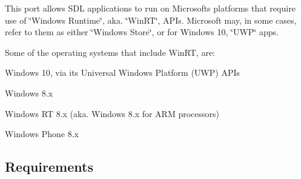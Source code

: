 This port allows S\+DL applications to run on Microsoft\textquotesingle{}s platforms that require use of \char`\"{}\+Windows Runtime\char`\"{}, aka. \char`\"{}\+Win\+R\+T\char`\"{}, A\+P\+Is. Microsoft may, in some cases, refer to them as either \char`\"{}\+Windows Store\char`\"{}, or for Windows 10, \char`\"{}\+U\+W\+P\char`\"{} apps.

Some of the operating systems that include Win\+RT, are\+:


\begin{DoxyItemize}
\item Windows 10, via its Universal Windows Platform (U\+WP) A\+P\+Is
\item Windows 8.\+x
\item Windows RT 8.\+x (aka. Windows 8.\+x for A\+RM processors)
\item Windows Phone 8.\+x
\end{DoxyItemize}

\subsection*{Requirements }


